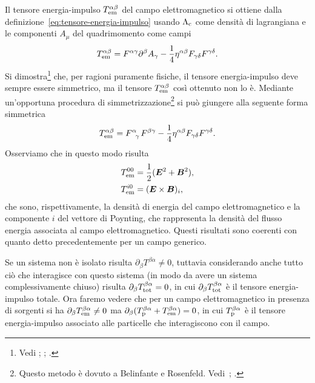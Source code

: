 Il tensore energia-impulso $T_{\textup{em}}^{\alpha\beta}$ del campo
elettromagnetico si ottiene dalla definizione~\eqref{eq:tensore-energia-impulso}
usando $\Lambda_{\textup{c}}$ come densità di lagrangiana e le componenti
$A_{\mu}$ del quadrimomento come campi
\begin{equation}
  T_{\textup{em}}^{\alpha\beta}
  = F^{\alpha\gamma}\partial^{\beta}A_{\gamma} -
  \frac{1}{4}\eta^{\alpha\beta}F_{\gamma\delta}F^{\gamma\delta}.
\end{equation}
Si
dimostra\footnote{Vedi \textcite[419]{barone:relativita};
  \textcite[111]{landau:campi}; \textcite[141-421]{misner:gravitation}.}
che, per ragioni puramente fisiche, il tensore energia-impulso deve sempre
essere simmetrico, ma il tensore $T_{\textup{em}}^{\alpha\beta}$ così ottenuto
non lo è.  Mediante un'opportuna procedura di
simmetrizzazione\footnote{Questo metodo è dovuto a Belinfante e Rosenfeld.
  Vedi~\textcite[437]{barone:relativita}; \textcite[114]{landau:campi}.}
si può giungere alla seguente forma simmetrica
\begin{equation}
  T_{\textup{em}}^{\alpha\beta} = \tensor{F}{^{\alpha}_{\gamma}}F^{\beta\gamma}
  - \frac{1}{4}\eta^{\alpha\beta}F_{\gamma\delta}F^{\gamma\delta}.
\end{equation}
Osserviamo che in questo modo risulta
\begin{subequations}
  \begin{align}
    T_{\textup{em}}^{00} &= \frac{1}{2}(\bm{E}^{2} + \bm{B}^{2}), \\
    T_{\textup{em}}^{i0} &= (\bm{E} \times \bm{B})_{i},
  \end{align}
\end{subequations}
che sono, rispettivamente, la densità di energia del campo elettromagnetico e la
componente $i$ del vettore di Poynting, che rappresenta la densità del flusso
energia associata al campo elettromagnetico.  Questi risultati sono coerenti con
quanto detto precedentemente per un campo generico.

Se un sistema non è isolato risulta $\partial_{\beta}T^{\beta\alpha} \neq 0$,
tuttavia considerando anche tutto ciò che interagisce con questo sistema (in
modo da avere un sistema complessivamente chiuso) risulta
$\partial_{\beta}T_{\textup{tot}}^{\beta\alpha} = 0$, in cui
$\partial_{\beta}T_{\textup{tot}}^{\beta\alpha}$ è il tensore energia-impulso
totale.  Ora faremo vedere che per un campo elettromagnetico in presenza di
sorgenti si ha $\partial_{\beta}T_{\textup{em}}^{\beta\alpha} \neq 0$ ma
$\partial_{\beta}(T_{\textup{p}}^{\beta\alpha} + T_{\textup{em}}^{\beta\alpha})
= 0$, in cui $T_{\textup{p}}^{\beta\alpha}$ è il tensore energia-impulso
associato alle particelle che interagiscono con il campo.

